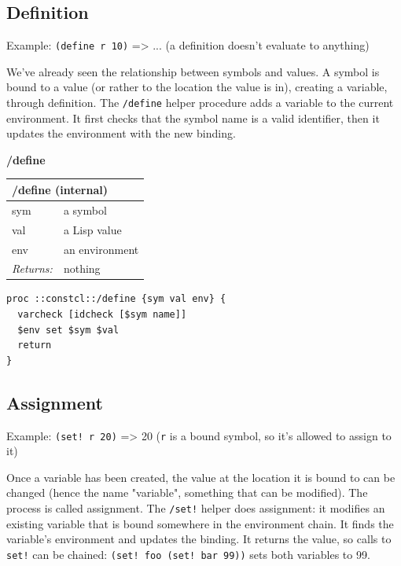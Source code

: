 \documentclass[twoside,9pt]{report}
\begin{document}
\subsection{Definition}
\label{definition}

Example: \texttt{(define r 10)} => ... (a definition doesn't evaluate to anything)


We've already seen the relationship between symbols and values. A symbol is bound to a value (or rather to the location the value is in), creating a variable, through definition. The \texttt{/define} helper procedure adds a variable to the current environment. It first checks that the symbol name is a valid identifier, then it updates the environment with the new binding.


\textbf{/define}

\begin{tabular}{ |l l| }
\hline
\multicolumn{2}{|l|}{/define (internal)} \\
\hline
sym & a symbol \\
val & a Lisp value \\
env & an environment \\
\textit{Returns:} & nothing \\
\hline
\end{tabular}

\noindent\makebox[\linewidth]{\rule{\linewidth}{0.4pt}}
\begin{lstlisting}
proc ::constcl::/define {sym val env} {
  varcheck [idcheck [$sym name]]
  $env set $sym $val
  return
}
\end{lstlisting}
\noindent\makebox[\linewidth]{\rule{\linewidth}{0.4pt}}
\subsection{Assignment}
\label{assignment}

Example: \texttt{(set! r 20)} => 20 (\texttt{r} is a bound symbol, so it's allowed to assign to it)


Once a variable has been created, the value at the location it is bound to can be changed (hence the name "variable", something that can be modified). The process is called assignment. The \texttt{/set!} helper does assignment: it modifies an existing variable that is bound somewhere in the environment chain. It finds the variable's environment and updates the binding. It returns the value, so calls to \texttt{set!} can be chained: \texttt{(set! foo (set! bar 99))} sets both variables to 99.
\end{document}
